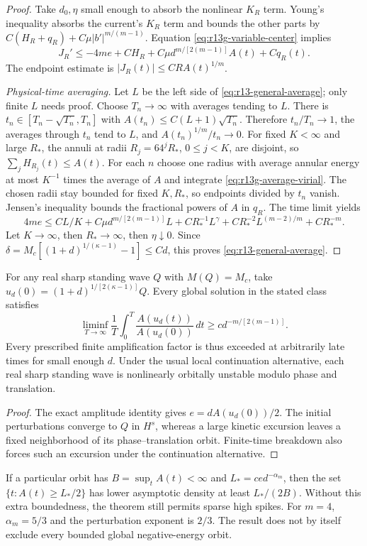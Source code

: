 \begin{proof}
Take $d_0,\eta$ small enough to absorb the nonlinear $K_R$ term.
Young's inequality absorbs the current's $K_R$ term and bounds the
other parts by $C(H_R+q_R)+C\mu|b'|^{m/(m-1)}$.
Equation \eqref{eq:r13g-variable-center} implies
\begin{equation}\label{eq:r13g-average-virial}
 J_R'\le-4me+CH_R+C\mu d^{m/[2(m-1)]}A(t)+Cq_R(t).
\end{equation}
The endpoint estimate is $|J_R(t)|\le CR A(t)^{1/m}$.

\medskip\noindent\emph{Physical-time averaging.}
Let $L$ be the left side of \eqref{eq:r13-general-average}; only finite
$L$ needs proof. Choose $T_n\to\infty$ with averages tending to $L$.
There is $t_n\in[T_n-\sqrt{T_n},T_n]$ with
$A(t_n)\le C(L+1)\sqrt{T_n}$. Therefore $t_n/T_n\to1$, the
averages through $t_n$ tend to $L$, and $A(t_n)^{1/m}/t_n\to0$.
For fixed $K<\infty$ and large $R_*$, the annuli at radii
$R_j=64^jR_*$, $0\le j<K$, are disjoint, so
$\sum_jH_{R_j}(t)\le A(t)$.
For each $n$ choose one radius with average annular energy at most
$K^{-1}$ times the average of $A$ and integrate
\eqref{eq:r13g-average-virial}.
The chosen radii stay bounded for fixed $K,R_*$, so endpoints divided
by $t_n$ vanish. Jensen's inequality bounds the fractional powers of
$A$ in $q_R$. The time limit yields
\[
 4me\le CL/K+C\mu d^{m/[2(m-1)]}L
       +CR_*^{-1}L^\gamma+CR_*^{-2}L^{(m-2)/m}+CR_*^{-m}.
\]
Let $K\to\infty$, then $R_*\to\infty$, then $\eta\downarrow0$.
Since $\delta=M_c[(1+d)^{1/(\kappa-1)}-1]\le Cd$, this proves
\eqref{eq:r13-general-average}.
\end{proof}

\begin{corollary}
\label{cor:r13-general-repeat}
For any real sharp standing wave $Q$ with $M(Q)=M_c$, take
$u_d(0)=(1+d)^{1/[2(\kappa-1)]}Q$.
Every global solution in the stated class satisfies
\[
 \liminf_{T\to\infty}\frac1T\int_0^T
  \frac{A(u_d(t))}{A(u_d(0))}\,dt
 \ge c d^{-m/[2(m-1)]}.
\]
Every prescribed finite amplification factor is thus exceeded at
arbitrarily late times for small enough $d$. Under the usual local
continuation alternative, each real sharp standing wave is nonlinearly
orbitally unstable modulo phase and translation.
\end{corollary}
\begin{proof}
The exact amplitude identity gives $e=dA(u_d(0))/2$.
The initial perturbations converge to $Q$ in $H^s$, whereas a large
kinetic excursion leaves a fixed neighborhood of its phase--translation
orbit. Finite-time breakdown also forces such an excursion under the
continuation alternative.
\end{proof}

If a particular orbit has $B=\sup_tA(t)<\infty$ and
$L_*=ce d^{-\alpha_m}$, then the set $\{t:A(t)\ge L_*/2\}$ has
lower asymptotic density at least $L_*/(2B)$. Without this extra
boundedness, the theorem still permits sparse high spikes. For $m=4$,
$\alpha_m=5/3$ and the perturbation exponent is $2/3$. The result does
not by itself exclude every bounded global negative-energy orbit.
